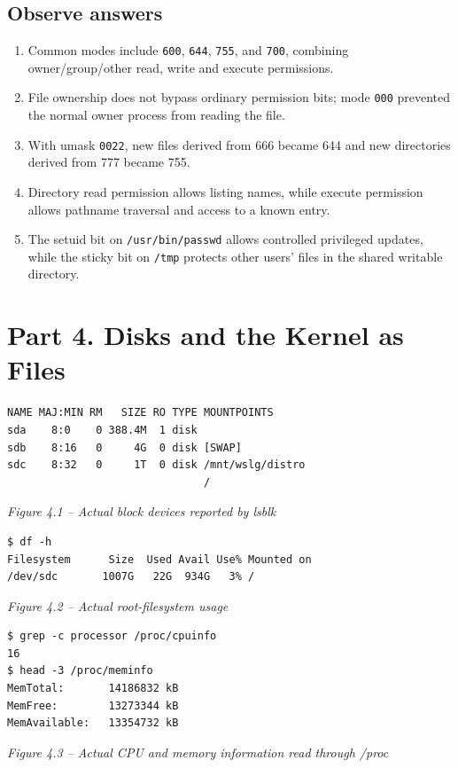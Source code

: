 \documentclass[12pt,a4paper]{article}
\newcommand{\figcap}[1]{\begin{center}\small\textit{#1}\end{center}\vspace{0.4em}}
\begin{document}
\subsection{Observe answers}
\begin{enumerate}[label=\arabic*.]
\item Common modes include \texttt{600}, \texttt{644}, \texttt{755}, and \texttt{700}, combining owner/group/other read, write and execute permissions.
\item File ownership does not bypass ordinary permission bits; mode \texttt{000} prevented the normal owner process from reading the file.
\item With umask \texttt{0022}, new files derived from 666 became 644 and new directories derived from 777 became 755.
\item Directory read permission allows listing names, while execute permission allows pathname traversal and access to a known entry.
\item The setuid bit on \texttt{/usr/bin/passwd} allows controlled privileged updates, while the sticky bit on \texttt{/tmp} protects other users' files in the shared writable directory.
\end{enumerate}

\section{Part 4. Disks and the Kernel as Files}
\begin{lstlisting}
NAME MAJ:MIN RM   SIZE RO TYPE MOUNTPOINTS
sda    8:0    0 388.4M  1 disk
sdb    8:16   0     4G  0 disk [SWAP]
sdc    8:32   0     1T  0 disk /mnt/wslg/distro
                               /
\end{lstlisting}
\figcap{Figure 4.1 -- Actual block devices reported by lsblk}

\begin{lstlisting}
$ df -h
Filesystem      Size  Used Avail Use% Mounted on
/dev/sdc       1007G   22G  934G   3% /
\end{lstlisting}
\figcap{Figure 4.2 -- Actual root-filesystem usage}

\begin{lstlisting}
$ grep -c processor /proc/cpuinfo
16
$ head -3 /proc/meminfo
MemTotal:       14186832 kB
MemFree:        13273344 kB
MemAvailable:   13354732 kB
\end{lstlisting}
\figcap{Figure 4.3 -- Actual CPU and memory information read through /proc}
\end{document}
